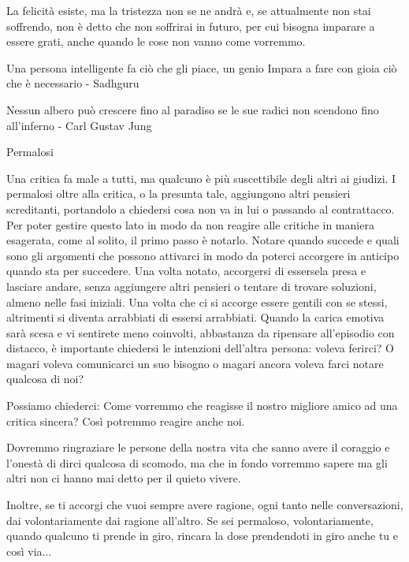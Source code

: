 \documentclass[12pt]{book} %
\begin{document}
\bigskip

La felicità esiste, ma la tristezza non se ne
andrà e, se
attualmente non stai soffrendo, non è detto che non soffrirai in futuro, per cui bisogna imparare a essere grati, anche
quando le cose non vanno come vorremmo. 


\bigskip

Una persona intelligente fa ciò che gli piace, un genio Impara a fare con gioia ciò che è necessario - Sadhguru


\bigskip

Nessun albero può crescere fino al paradiso se le sue radici non scendono fino all'inferno - Carl Gustav Jung


\bigskip
\begin{mdframed}[linewidth=1pt]
Permalosi

Una critica fa male a tutti, ma qualcuno è più suscettibile degli altri ai giudizi. I permalosi oltre alla critica, o la
presunta tale, aggiungono altri pensieri screditanti, portandolo a chiedersi cosa non va in lui o passando al
contrattacco. Per poter gestire questo lato in modo da non reagire alle critiche in maniera esagerata, come al solito,
il primo passo è notarlo. Notare quando succede e quali sono gli argomenti che possono attivarci in modo da poterci
accorgere in anticipo quando sta per succedere. Una volta notato, accorgersi di essersela presa e lasciare andare,
senza aggiungere altri pensieri o tentare di trovare soluzioni, almeno nelle fasi iniziali. Una volta che ci si accorge
essere gentili con se stessi, altrimenti si diventa arrabbiati di essersi arrabbiati. Quando la carica emotiva sarà
scesa e vi sentirete meno coinvolti, abbastanza da ripensare all'episodio con distacco, è
importante chiedersi le intenzioni dell'altra persona: voleva ferirci? O magari voleva comunicarci
un suo bisogno o magari ancora voleva farci notare qualcosa di noi?

Possiamo chiederci: Come vorremmo che reagisse il nostro migliore amico ad una critica sincera? Così potremmo reagire
anche noi. 

Dovremmo ringraziare le persone della nostra vita che sanno avere il coraggio e l'onestà di dirci
qualcosa di scomodo, ma che in fondo vorremmo sapere ma gli altri non ci hanno mai detto per il quieto vivere.

Inoltre, se ti accorgi che vuoi sempre avere ragione, ogni tanto nelle conversazioni, dai volontariamente dai ragione
all'altro. Se sei permaloso, volontariamente, quando qualcuno ti prende in giro, rincara la dose prendendoti in giro
anche tu e così via...
\end{mdframed}
\end{document}

